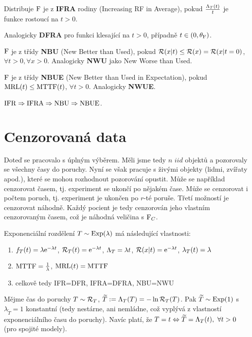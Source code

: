 \begin{define}
	Distribuje $\mathrm{F}$ je z \textbf{IFRA} rodiny (Increasing RF in Average), pokud $\frac{\Lambda_T(t)}{t}$ je funkce rostoucí na $t>0$.
	
	Analogicky \textbf{DFRA} pro funkci klesající na $t>0$, případně $t\in(0,\theta_{\mathrm{F}})$.
\end{define}

\begin{define}
	$\mathrm{F}$ je z třídy \textbf{NBU} (New Better than Used), pokud $\mathcal{R}(x|t)\leq\mathcal{R}(x)=\mathcal{R}(x|t=0)$, $\forall t>0,\forall x>0$. Analogicky \textbf{NWU} jako New Worse than Used.
\end{define}

\begin{define}
		$\mathrm{F}$ je z třídy \textbf{NBUE} (New Better than Used in Expectation), pokud $\mathrm{MRL}(t)\leq \mathrm{MTTF}(t)$, $\forall t>0$. Analogicky \textbf{NWUE}.
\end{define}

\begin{theorem}
	$\mathrm{IFR}\Rightarrow\mathrm{IFRA}\Rightarrow\mathrm{NBU}\Rightarrow\mathrm{NBUE}$.
\end{theorem}

\section{Cenzorovaná data}
Doteď se pracovalo s úplným výběrem. Měli jsme tedy $n$ $iid$ objektů a pozorovaly se všechny časy do poruchy. Nyní se však pracuje s živými objekty (lidmi, zvířaty apod.), které se mohou rozhodnout pozorování opustit. Může se například cenzorovat časem, tj. experiment se ukončí po nějakém čase. Může se cenzorovat i počtem poruch, tj. experiment je ukončen po $r$-té poruše. Třetí možností je cenzorovat náhodně. Každý pocient je tedy cenzorován jeho vlastním cenzorovaným časem, což je náhodná veličina s $\mathrm{F}_C$.

\begin{example}
	Exponenciální rozdělení $T\sim\mathrm{Exp}(\lambda)$ má následující vlastnosti:\begin{enumerate}
		\item $f_T(t)=\lambda\mathrm{e}^{-\lambda t}$, $\mathcal{R}_T(t)=\mathrm{e}^{-\lambda t}$, $\Lambda_T=\lambda t$, $\mathcal{R}(x|t)=\mathrm{e}^{-\lambda t}$, $\lambda_T(t)=\lambda$
		\item $\mathrm{MTTF}=\frac{1}{\lambda}$, $\mathrm{MRL}(t)=\mathrm{MTTF}$
		\item celkově tedy IFR=DFR, IFRA=DFRA, NBU=NWU
	\end{enumerate}
\end{example}
\begin{theorem}
	Mějme čas do poruchy $T\sim\mathcal{R}_T$, $\widetilde{T}:=\Lambda_T(T)=-\ln\mathcal{R}_T(T)$. Pak $\widetilde{T}\sim\mathrm{Exp}(1)$ s $\lambda_{\widetilde{T}}=1$ konstantní (tedy nestárne, ani nemládne, což vyplývá z vlastností exponenciálního času do poruchy). Navíc platí, že $T=t\Leftrightarrow \widetilde{T}=\Lambda_T(t),~\forall t>0$ (pro spojité modely).
\end{theorem}

